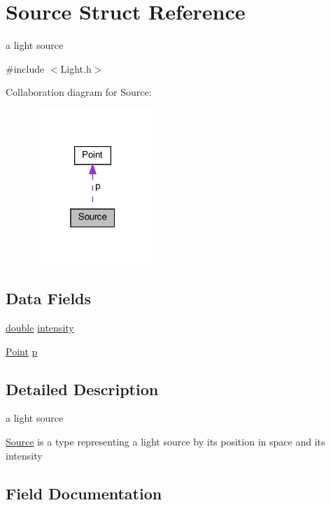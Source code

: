 \hypertarget{struct_source}{}\section{Source Struct Reference}
\label{struct_source}


a light source  




{\ttfamily \#include $<$Light.\+h$>$}



Collaboration diagram for Source\+:\nopagebreak
\begin{figure}[H]
\begin{center}
\leavevmode
\includegraphics[width=127pt]{struct_source__coll__graph}
\end{center}
\end{figure}
\subsection*{Data Fields}
\begin{DoxyCompactItemize}
\item 
\hyperlink{g3x__transfo_8h_a89b2b23e407882a535d835574a7912e1}{double} \hyperlink{struct_source_a2118076db8e8f8a25c2376e1d4acfb67}{intensity}
\item 
\hyperlink{struct_point}{Point} \hyperlink{struct_source_ae273773add45375b65c8555736acb60f}{p}
\end{DoxyCompactItemize}


\subsection{Detailed Description}
a light source 

\hyperlink{struct_source}{Source} is a type representing a light source by its position in space and its intensity 

\subsection{Field Documentation}
\mbox{\label{struct_source_a2118076db8e8f8a25c2376e1d4acfb67}} 
